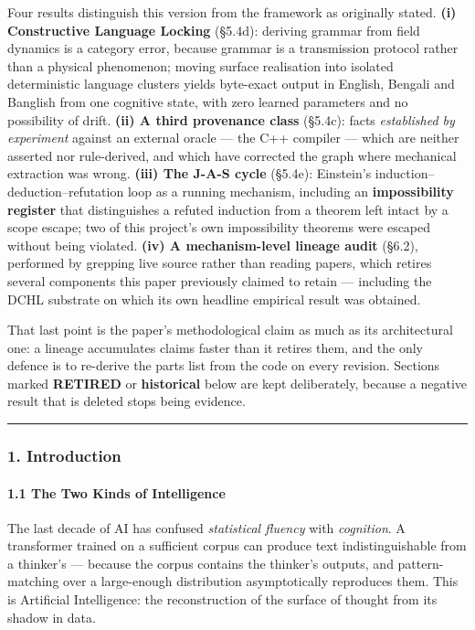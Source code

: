 \documentclass[
  11pt,
  a4paper,
]{article}
\begin{document}
Four results distinguish this version from the framework as originally
stated. \textbf{(i) Constructive Language Locking} (§5.4d): deriving
grammar from field dynamics is a category error, because grammar is a
transmission protocol rather than a physical phenomenon; moving surface
realisation into isolated deterministic language clusters yields
byte-exact output in English, Bengali and Banglish from one cognitive
state, with zero learned parameters and no possibility of drift.
\textbf{(ii) A third provenance class} (§5.4c): facts \emph{established
by experiment} against an external oracle --- the C++ compiler --- which
are neither asserted nor rule-derived, and which have corrected the
graph where mechanical extraction was wrong. \textbf{(iii) The J-A-S
cycle} (§5.4e): Einstein's induction--deduction--refutation loop as a
running mechanism, including an \textbf{impossibility register} that
distinguishes a refuted induction from a theorem left intact by a scope
escape; two of this project's own impossibility theorems were escaped
without being violated. \textbf{(iv) A mechanism-level lineage audit}
(§6.2), performed by grepping live source rather than reading papers,
which retires several components this paper previously claimed to retain
--- including the DCHL substrate on which its own headline empirical
result was obtained.

That last point is the paper's methodological claim as much as its
architectural one: a lineage accumulates claims faster than it retires
them, and the only defence is to re-derive the parts list from the code
on every revision. Sections marked \textbf{RETIRED} or
\textbf{historical} below are kept deliberately, because a negative
result that is deleted stops being evidence.

\begin{center}\rule{0.5\linewidth}{0.5pt}\end{center}

\subsubsection{1. Introduction}\label{introduction}

\paragraph{1.1 The Two Kinds of
Intelligence}\label{the-two-kinds-of-intelligence}

The last decade of AI has confused \emph{statistical fluency} with
\emph{cognition}. A transformer trained on a sufficient corpus can
produce text indistinguishable from a thinker's --- because the corpus
contains the thinker's outputs, and pattern-matching over a large-enough
distribution asymptotically reproduces them. This is Artificial
Intelligence: the reconstruction of the surface of thought from its
shadow in data.
\end{document}
